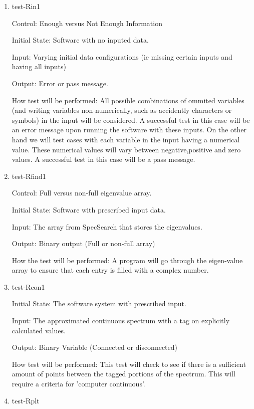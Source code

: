 \documentclass[12pt, titlepage]{article}
\begin{document}
\begin{enumerate}

\item{test-Rin1\\}

Control: Enough versus Not Enough Information
					
Initial State: Software with no inputed data.
					
Input: Varying initial data configurations (ie missing certain inputs and 
having all inputs)
					
Output: Error or pass message.
					
How test will be performed: All possible combinations of ommited variables (and 
writing variables non-numerically, such as accidently characters or symbols) in 
the input will be considered. A successful test in this case will be an error 
message upon running the software with these inputs. On the other hand we will 
test cases with each variable in the input having a numerical value. These 
numerical values will vary between negative,positive and zero values. A 
successful test in this case will be a pass message.
					
\item{test-Rfind1} 

Control: Full versus non-full eigenvalue array. 

Initial State: Software with prescribed input data. 

Input: The array from SpecSearch that stores the eigenvalues. 

Output: Binary output (Full or non-full array)

How the test will be performed: A program will go through the eigen-value array 
to ensure that each entry is filled with a complex number. 


\item{test-Rcon1} 

Initial State: The software system with prescribed input.

Input: The approximated continuous spectrum with a tag on explicitly calculated 
values.

Output: Binary Variable (Connected or disconnected)

How test will be performed: This test will check to see if there is a 
sufficient amount of points between the tagged portions of the spectrum. This 
will require a criteria for 'computer continuous'. 

\item{test-Rplt} 


\end{enumerate}
\end{document}
